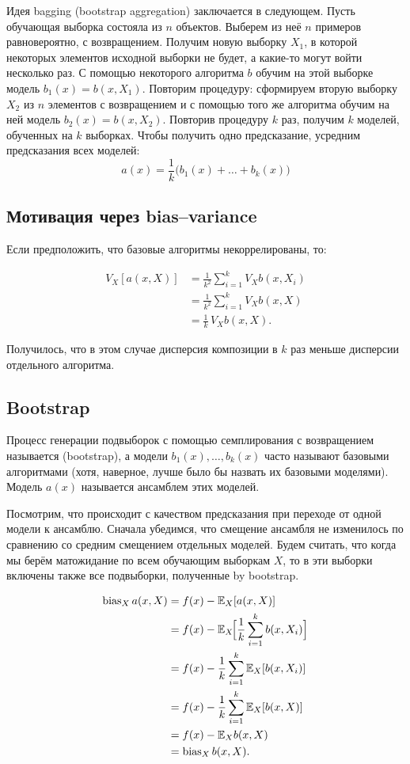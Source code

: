 Идея bagging (bootstrap aggregation) заключается в следующем.
Пусть обучающая выборка состояла из $n$ объектов.
Выберем из неё $n$ примеров равновероятно, с возвращением.
Получим новую выборку $X_1$, в которой некоторых элементов исходной выборки не будет, а какие-то могут войти
несколько раз.
С помощью некоторого алгоритма $b$ обучим на этой выборке модель $b_1(x) = b(x, X_1)$.
Повторим процедуру: сформируем вторую выборку $X_2$ из $n$ элементов с возвращением и с помощью того же алгоритма
обучим на ней модель $b_2(x) = b(x, X_2)$.
Повторив процедуру $k$ раз, получим $k$ моделей, обученных на $k$ выборках.
Чтобы получить одно предсказание, усредним предсказания всех моделей:
\[ a(x) = \frac{1}{k}\bigl(b_1(x) + \dots + b_k(x)\bigr) \]

\subsection{Мотивация через bias–variance}

Если предположить, что базовые алгоритмы некоррелированы, то:

\begin{align*}
    V_X[a(x,X)] &= \frac{1}{k^2}\sum_{i=1}^k V_X b(x,X_i) \\
    &= \frac{1}{k^2}\sum_{i=1}^k V_X b(x,X) \\
    &= \frac{1}{k}\, V_X b(x,X).
\end{align*}

Получилось, что в этом случае дисперсия композиции в $k$ раз меньше дисперсии отдельного алгоритма.

\subsection{Bootstrap}

Процесс генерации подвыборок с помощью семплирования с возвращением называется (bootstrap), а модели $b_1(x),
\dots,b_k(x)$ часто называют базовыми алгоритмами (хотя, наверное, лучше было бы назвать их базовыми моделями).
Модель $a(x)$ называется ансамблем этих моделей.

Посмотрим, что происходит с качеством предсказания при переходе от одной модели к ансамблю.
Сначала убедимся, что смещение ансамбля не изменилось по сравнению со средним смещением отдельных моделей.
Будем считать, что когда мы берём матожидание по всем обучающим выборкам $X$, то в эти выборки включены также все
подвыборки, полученные by bootstrap.

\begin{align*}
    \operatorname{bias}_X a(x,X) &= f(x) - \mathbb{E}_X[a(x,X)] \\
    &= f(x) - \mathbb{E}_X\!\Bigl[\frac{1}{k}\sum_{i=1}^k b(x,X_i)\Bigr] \\
    &= f(x) - \frac{1}{k}\sum_{i=1}^k \mathbb{E}_X[b(x,X_i)] \\
    &= f(x) - \frac{1}{k}\sum_{i=1}^k \mathbb{E}_X[b(x,X)] \\
    &= f(x) - \mathbb{E}_X b(x,X) \\
    &= \operatorname{bias}_X b(x,X).
\end{align*}


